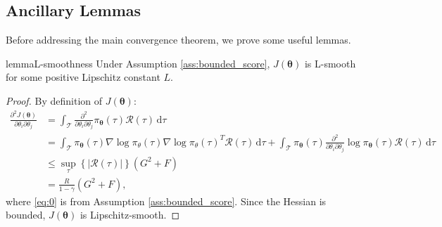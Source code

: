 \documentclass{article}
\theoremstyle{remark}
\theoremstyle{definition}
\newcommand{\Dij}[2]{\frac{\partial^{2}{#1}}{\partial{#2}_i\partial{#2}_j}}
\newcommand{\de}{\,\mathrm{d}}
\newcommand{\vtheta}{\boldsymbol{\theta}}
\newcommand{\Tspace}{\mathcal{T}}
\newcommand{\Reward}{\mathcal{R}}
\newcommand{\pol}{\pi_{\vtheta}}
\newcommand{\score}[2]{\nabla\log\pi_{#1}(#2)}
\newcommand{\GRADLOG}{G}
\newcommand{\HESSLOG}{F}
\begin{document}
\subsection*{Ancillary Lemmas}
Before addressing the main convergence theorem, we prove some useful lemmas.

 
\begin{restatable}[]{lemma}{L-smoothness}\label{lemma:lsmooth}
	Under Assumption \ref{ass:bounded_score}, $J(\vtheta)$ is L-smooth for some positive Lipschitz constant $L$.
\end{restatable}
\begin{proof}
By definition of $J(\vtheta)$:
\begin{align}
\Dij{J(\vtheta)}{\theta} 
&= \int_{\Tspace}\Dij{}{\theta}\pol(\tau)\Reward(\tau)\de \tau
\nonumber\\ 
&= \int_{\Tspace}\pol(\tau)\score{\theta}{\tau}\score{\theta}{\tau}^T\Reward(\tau)\de \tau + \int_{\Tspace}\pol(\tau)\Dij{}{\theta}\log\pol(\tau)\Reward(\tau)\de \tau \nonumber\\
&\leq \sup_{\tau} \left\{\left|\Reward(\tau)\right|\right\} \left(\GRADLOG^2+\HESSLOG\right) \label{eq:0}\\
&= \frac{R}{1-\gamma}\left(\GRADLOG^2+\HESSLOG\right),\nonumber
\end{align}
where \ref{eq:0} is from Assumption \ref{ass:bounded_score}.
Since the Hessian is bounded, $J(\vtheta)$ is Lipschitz-smooth.
\end{proof}
\end{document}
